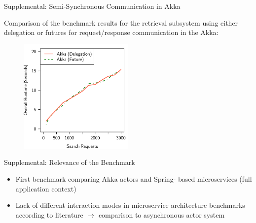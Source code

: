 \documentclass{beamer}
\begin{document}
\begin{frame}{Supplemental: Semi-Synchronous Communication in Akka}

Comparison of the benchmark results for the retrieval subsystem using either delegation or futures for request/response communication in the Akka:

\begin{center}
  \begin{figure} 
    \includegraphics[width=0.5\textwidth]{graphics/eval-search-comparison-akka-delegation-future.pdf} 
  \end{figure}
\end{center}

\end{frame}


\begin{frame}{Supplemental: Relevance of the Benchmark}

\begin{itemize}
  \item First benchmark comparing Akka actors and Spring- based microservices (full application context)
  \item Lack of different interaction modes in microservice architecture benchmarks according to literature $\rightarrow$ comparison to asynchronous actor system
\end{itemize}

\end{frame}
\end{document}
